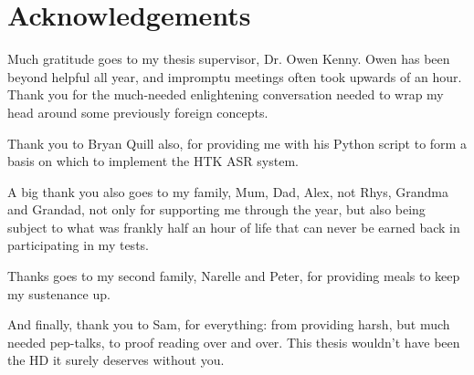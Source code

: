 
\chapter*{Acknowledgements}

%

%
Much gratitude goes to my thesis supervisor, Dr. Owen Kenny. Owen
has been beyond helpful all year, and impromptu meetings often took
upwards of an hour. Thank you for the much-needed enlightening conversation
needed to wrap my head around some previously foreign concepts.

Thank you to Bryan Quill also, for providing me with his Python script
to form a basis on which to implement the HTK ASR system.

A big thank you also goes to my family, Mum, Dad, Alex, not Rhys,
Grandma and Grandad, not only for supporting me through the year,
but also being subject to what was frankly half an hour of life that
can never be earned back in participating in my tests.

Thanks goes to my second family, Narelle and Peter, for providing
meals to keep my sustenance up.

And finally, thank you to Sam, for everything: from providing harsh,
but much needed pep-talks, to proof reading over and over. This thesis
wouldn't have been the HD it surely deserves without you.
